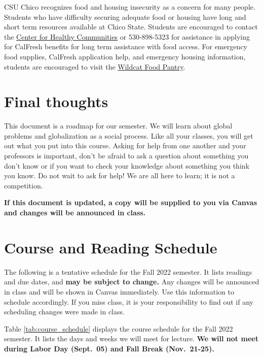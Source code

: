 \documentclass[11pt,]{article}
\begin{document}
CSU Chico recognizes food and housing insecurity as a concern for many
people. Students who have difficulty securing adequate food or housing
have long and short term resources available at Chico State. Students
are encouraged to contact the
\href{https://www.csuchico.edu/chc/}{Center for Healthy Communities} or
530-898-5323 for assistance in applying for CalFresh benefits for long
term assistance with food access. For emergency food supplies, CalFresh
application help, and emergency housing information, students are
encouraged to visit the
\href{https://www.csuchico.edu/basic-needs/pantry.shtml}{Wildcat Food
Pantry}.

\hypertarget{final-thoughts}{%
\section{Final thoughts}\label{final-thoughts}}

This document is a roadmap for our semester. We will learn about global
problems and globalization as a social process. Like all your classes,
you will get out what you put into this course. Asking for help from one
another and your professors is important, don't be afraid to ask a
question about something you don't know or if you want to check your
knowledge about something you think you know. Do not wait to ask for
help! We are all here to learn; it is not a competition.

\textbf{If this document is updated, a copy will be supplied to you via
Canvas and changes will be announced in class.}

\newpage

\renewcommand{\arraystretch}{1.25}

\hypertarget{course-and-reading-schedule}{%
\section{Course and Reading
Schedule}\label{course-and-reading-schedule}}

The following is a tentative schedule for the Fall 2022 semester. It
lists readings and due dates, and \textbf{may be subject to change.} Any
changes will be announced in class and will be shown in Canvas
immediately. Use this information to schedule accordingly. If you miss
class, it is your responsibility to find out if any scheduling changes
were made in class.

Table \ref{tab:course_schedule} displays the course schedule for the
Fall 2022 semester. It lists the days and weeks we will meet for
lecture. \textbf{We will not meet during Labor Day (Sept.~05) and Fall
Break (Nov.~21-25).}
\end{document}
